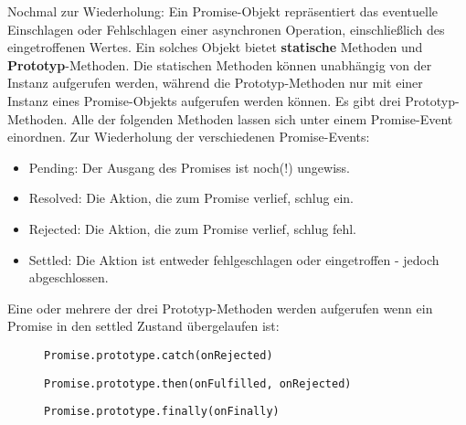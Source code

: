 Nochmal zur Wiederholung: Ein Promise-Objekt repräsentiert das eventuelle Einschlagen oder Fehlschlagen einer asynchronen Operation, einschließlich des eingetroffenen Wertes. Ein solches Objekt bietet \textbf{statische} Methoden und \textbf{Prototyp}-Methoden. Die statischen Methoden können unabhängig von der Instanz aufgerufen werden, während die Prototyp-Methoden nur mit einer Instanz eines Promise-Objekts aufgerufen werden können. Es gibt drei Prototyp-Methoden. Alle der folgenden Methoden lassen sich unter einem Promise-Event einordnen.
Zur Wiederholung der verschiedenen Promise-Events:

\begin{itemize} 
\item Pending: Der Ausgang des Promises ist noch(!) ungewiss.
\item Resolved: Die Aktion, die zum Promise verlief, schlug ein.
\item Rejected: Die Aktion, die zum Promise verlief, schlug fehl.
\item Settled: Die Aktion ist entweder fehlgeschlagen oder eingetroffen - jedoch abgeschlossen.
\end{itemize}

\noindent
Eine oder mehrere der drei Prototyp-Methoden werden aufgerufen wenn ein Promise in den settled Zustand übergelaufen ist:

\begin{description}

\begin{figure}[H]
\item \begin{lstlisting}
Promise.prototype.catch(onRejected)
\end{lstlisting}
\end{figure}

\begin{figure}[H]
\item \begin{lstlisting}
Promise.prototype.then(onFulfilled, onRejected)
\end{lstlisting}
\end{figure}
 
\begin{figure}[H]
\item \begin{lstlisting} 
Promise.prototype.finally(onFinally)
\end{lstlisting}
\end{figure}
 
\end{description}

